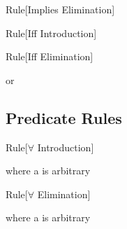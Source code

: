 \begin{namedthm}{Rule}[Implies Elimination]

\begin{bprooftree}
\end{bprooftree}\qquad 

\end{namedthm}

\begin{namedthm}{Rule}[Iff Introduction]

\begin{bprooftree}
\end{bprooftree}\qquad 

\end{namedthm}

\begin{namedthm}{Rule}[Iff Elimination]

\begin{bprooftree}
\end{bprooftree}\qquad or \qquad
\begin{bprooftree}
\end{bprooftree}

\end{namedthm}

\subsection{Predicate Rules}
\label{appendix:nd-pred}

\begin{namedthm}{Rule}[$\forall$ Introduction]

\begin{bprooftree}
\end{bprooftree}\qquad where a is arbitrary \qquad

\end{namedthm}

\begin{namedthm}{Rule}[$\forall$ Elimination]

\begin{bprooftree}
\end{bprooftree}\qquad where a is arbitrary \qquad

\end{namedthm}


